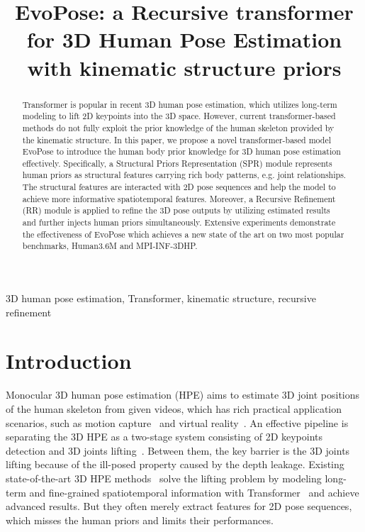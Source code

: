 \documentclass{article}
\title{EvoPose: a Recursive transformer for 3D Human Pose Estimation with kinematic structure priors}
\begin{document}
\maketitle
\let\thefootnote\relax{}
\begin{abstract}
Transformer is popular in recent 3D human pose estimation, which utilizes long-term modeling to lift 2D keypoints into the 3D space. 
However, current transformer-based methods do not
fully exploit the prior knowledge of the human skeleton provided by the kinematic structure. In this paper, we propose a novel transformer-based model EvoPose to introduce the human body prior knowledge for 3D human pose estimation effectively. 
Specifically, a Structural Priors Representation (SPR) module represents human priors as structural features carrying rich body patterns, e.g. joint relationships. The structural features are interacted with 2D pose sequences and help the model to achieve more informative spatiotemporal features.
Moreover,
a Recursive Refinement (RR) module is applied to refine the 3D pose outputs by utilizing estimated results and further injects human priors simultaneously. 
Extensive experiments demonstrate the effectiveness of EvoPose which achieves a new state of the art on two most popular benchmarks, Human3.6M and MPI-INF-3DHP.\end{abstract}
\begin{keywords}
3D human pose estimation, Transformer, kinematic structure, recursive refinement
\end{keywords}\section{Introduction}\label{sec:intro}
Monocular 3D human pose estimation (HPE) aims to estimate 3D joint positions of the human skeleton from given videos, which has rich practical application scenarios, such as motion capture~\cite{desmarais2021review,li2022lidarcap}
and virtual reality~\cite{mehta2017vnect}. An effective pipeline is separating the 3D HPE as a two-stage system consisting of 2D keypoints detection and 3D joints lifting~\cite{chen20173d}. 
Between them, the key barrier is the 3D joints lifting because of the ill-posed property caused by the depth leakage. 
Existing state-of-the-art 3D HPE methods~\cite{li2022exploiting,zheng20213d,hassanin2022crossformer} solve the lifting problem by modeling long-term and fine-grained spatiotemporal information with Transformer~\cite{vaswani2017attention} and achieve advanced results. But they often merely extract features for 2D pose sequences, which misses the human priors and limits their performances.
\end{document}
